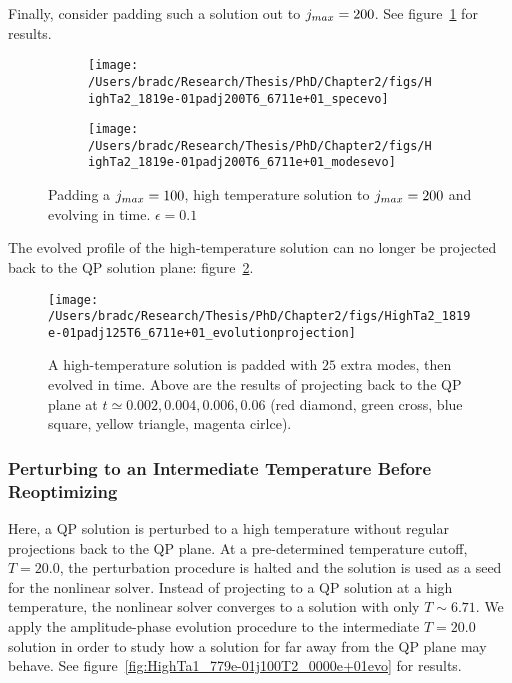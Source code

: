 \documentclass[../PhD.tex]{subfiles}
\begin{document}
Finally, consider padding such a solution out to $j_{max} = 200$. See figure~\ref{fig:HighTa2_1819e-01padj200T6_6711e+01_evo} for results.

\begin{figure}[h]
	\centering
	\begin{subfigure}[t]{0.45\textwidth}
		\texttt{[image: /Users/bradc/Research/Thesis/PhD/Chapter2/figs/HighTa2\_1819e-01padj200T6\_6711e+01\_specevo]}
	\end{subfigure}
	\;
	\begin{subfigure}[t]{0.45\textwidth}
		\texttt{[image: /Users/bradc/Research/Thesis/PhD/Chapter2/figs/HighTa2\_1819e-01padj200T6\_6711e+01\_modesevo]}
	\end{subfigure}
	\caption{Padding a $j_{max} = 100$, high temperature solution to $j_{max} = 200$ and evolving in time. $\epsilon = 0.1$}
	\label{fig:HighTa2_1819e-01padj200T6_6711e+01_evo}
\end{figure}

The evolved profile of the high-temperature solution can no longer be projected back to the QP solution plane: figure~\ref{fig: HighTa2_1819e-01padj125T6_6711e+01_evolutionprojection}.

\begin{figure}[h]
	\centering
	\texttt{[image: /Users/bradc/Research/Thesis/PhD/Chapter2/figs/HighTa2\_1819e-01padj125T6\_6711e+01\_evolutionprojection]}
	\caption{A high-temperature solution is padded with $25$ extra modes, then evolved in time. Above are the results of projecting back to the QP plane at $t \simeq 0.002, 0.004, 0.006, 0.06$ (red diamond, green cross, blue square, yellow triangle, magenta cirlce).}
	\label{fig: HighTa2_1819e-01padj125T6_6711e+01_evolutionprojection}
\end{figure}



\subsubsection{Perturbing to an Intermediate Temperature Before Reoptimizing}

Here, a QP solution is perturbed to a high temperature without regular projections back to the QP plane. At a pre-determined temperature cutoff, $T = 20.0$, the perturbation procedure is halted and the solution is used as a seed for the nonlinear solver. Instead of projecting to a QP solution at a high temperature, the nonlinear solver converges to a solution with only $T \sim 6.71$. We apply the amplitude-phase evolution procedure to the intermediate $T = 20.0$ solution in order to study how a solution for far away from the QP plane may behave. See figure~\ref{fig:HighTa1_779e-01j100T2_0000e+01evo} for results.
\end{document}

